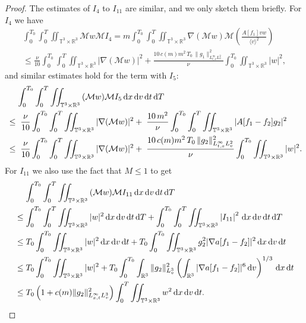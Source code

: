 \documentclass[11pt,american, reqno]{amsart}
\numberwithin{equation}{section}
\newcommand{\R}{\mathbb R}
\newcommand{\1}{\mathds{1}}
\newcommand{\dt}{\, {\rm d} t}
\newcommand{\dT}{\, {\rm d} T}
\newcommand{\dv}{\, {\rm d} v}
\newcommand{\dx}{\, {\rm d} x}
\newcommand{\CalM}{\mathcal{M}}
\newcommand{\vpran}[1]{\left(#1\right)}
\newcommand{\T}{\mathbb{T}}
\numberwithin{equation}{section}
\begin{document}
\begin{proof}
The estimates of ${I_4}$ to ${I_{11}}$ are similar, and we only sketch them briefly. For ${I_4}$ we have 
\begin{align*}
   \int_0^{T_0}\int_0^{T} \iint_{\T^3 \times \R^3}  \CalM w \CalM I_4 %
= m  \int_0^{T_0}\int_0^{T} \iint_{\T^3 \times \R^3}  \nabla (\CalM w ) \CalM\left(\frac{A[f_1]v  w }{\langle v \rangle ^2} \right) %
\\
\le  
\frac{\nu}{10}  \int_0^{T_0}\int_0^{T} \iint_{\T^3 \times \R^3}  |\nabla (\CalM w )| ^2 %
+ \frac{10 \, c(m) m^2 \, T_0 \, \|g_1\|^2_{L^\infty_{t,x}L^2_v}}{\nu}  \int_0^{T_0} \iint_{\T^3 \times \R^3}  | {w} |^2, %
\end{align*}
and similar estimates hold for the term with $I_5$:  %
\begin{align*}
& \quad \,
\int_0^{T_0}\int_0^{T} \iint_{\T^3 \times \R^3} 
 {({\CalM}w)} {\CalM} I_5 \dx\dv\dt\dT
\\ 
& \le \;  \frac{\nu}{10}  \int_0^{T_0}\int_0^{T} \iint_{\T^3 \times \R^3}  
|\nabla (\CalM w )| ^2 %
+ \; \frac{10 \, m^2}{\nu}  \int_0^{T_0}  \int_0^T \iint_{\T^3 \times \R^3} 
|A[f_1-f_2]  g_2|^2 %
\\
&\le \;  \frac{\nu}{10}  \int_0^{T_0}\int_0^{T} \iint_{\T^3 \times \R^3}  |\nabla (\CalM w )| ^2 %
+ \; \frac{10 \, c(m)m^2 \, T_0 \, \|g_2\|^2_{L^\infty_{t,x}L^2_v}}{\nu}  \int_0^{T_0} \iint_{\T^3 \times \R^3}  |w|^2. %
\end{align*}
For $I_{11}$ we also use the fact that $ {M} \le 1$ to get 
\begin{align*}
& \quad \,
\int_0^{T_0}\int_0^{T} \iint_{\T^3 \times \R^3} { ( {\CalM} w)  } \CalM {I_{11}} \dx\dv\dt\dT  
\\
&\le 
\int_0^{T_0}\int_0^{T} \iint_{\T^3 \times \R^3} |w| ^2 \dx\dv\dt\dT 
+ \int_0^{T_0}\int_0^{T} \iint_{\T^3 \times \R^3} \left| I_{11}\right|^2 \dx\dv\dt\dT
\\
&\le 
T_0 \int_0^{T_0} \iint_{\T^3 \times \R^3}  | w| ^2 \dx\dv\dt  
+  T_0 \int_0^{T_0} \iint_{\T^3 \times \R^3}  g_2^2 | \nabla a[f_1-f_2]|^2 \dx\dv\dt 
\\
&\le   
T_0 \int_0^{T_0} \iint_{\T^3 \times \R^3} |w| ^2 %
+  T_0 \int_0^{T_0} \int_{\mathbb{R}^3} \|g_2\|_{L_v^3}^2\left( \int_{\mathbb{R}^3} | \nabla a[f_1-f_2]|^6 \dv \right)^{1/3} \dx\dt
\\
&\le   
T_0 \vpran{1+ c(m) \|g_2\|^2_{L^\infty_{x,t}L_v^3}} \int_0^{T} \iint_{\T^3 \times \R^3} w^2 \dx\dv\dt.
\end{align*}

\end{proof}
\end{document}
